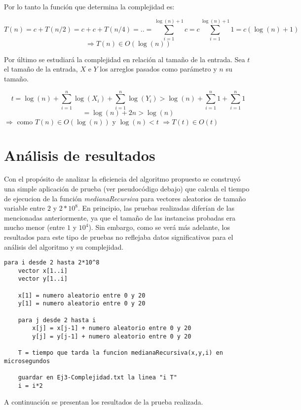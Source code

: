\documentclass[a4paper,10pt] {article}
\begin{document}
Por lo tanto la funci\'on que determina la complejidad es:

$$T(n)=c+T(n/2)=c+c+T(n/4)=..= \sum_{i=1}^{\log(n)+1}c=c\sum_{i=1}^{\log(n)+1}1=c(\log(n)+1)$$
$$\Longrightarrow T(n)\in O(\log(n))$$

Por \'ultimo se estudiar\'a la complejidad en relaci\'on al tama\~{n}o de la entrada. Sea $t$ el tama\~{n}o de la entrada, $X$ e $Y$ los arreglos pasados como par\'ametro y $n$ su tama\~{n}o.

$$t=\log(n)+\sum_{i=1}^{n}\log(X_{i})+\sum_{i=1}^{n}\log(Y_{i})>\log(n)+\sum_{i=1}^{n} 1+\sum_{i=1}^{n} 1$$
$$=\log(n)+2n>\log(n)$$
\hspace*{90pt}$\Longrightarrow$ como $T(n)\in O(\log(n))$ y $\log(n)<t$ $\Longrightarrow T(t)\in O(t)$

\section*{An\'alisis de resultados}

Con el prop\'osito de analizar la eficiencia del algoritmo propuesto se construy\'o una simple aplicaci\'on de prueba (ver pseudoc\'odigo debajo) que calcula el tiempo de ejecucion de la funci\'on \textit{medianaRecursiva} para vectores aleatorios de tama\~{n}o variable entre $2$ y $2*10^{8}$. En principio, las pruebas realizadas difer\'ian de las mencionadas anteriormente, ya que el tama\~{n}o de las instancias probadas era mucho menor (entre $1$ y $10^{4}$). Sin embargo, como se ver\'a m\'as adelante, los resultados para este tipo de pruebas no reflejaba datos significativos para el an\'alisis del algoritmo y su complejidad.

\begin{verbatim}
para i desde 2 hasta 2*10^8
	vector x[1..i]
	vector y[1..i]

	x[1] = numero aleatorio entre 0 y 20
	y[1] = numero aleatorio entre 0 y 20
	
	para j desde 2 hasta i
		x[j] = x[j-1] + numero aleatorio entre 0 y 20
		y[j] = y[j-1] + numero aleatorio entre 0 y 20

	T = tiempo que tarda la funcion medianaRecursiva(x,y,i) en microsegundos

	guardar en Ej3-Complejidad.txt la linea "i T"
	i = i*2
\end{verbatim}

A continuaci\'on se presentan los resultados de la prueba realizada.

\end{document}
